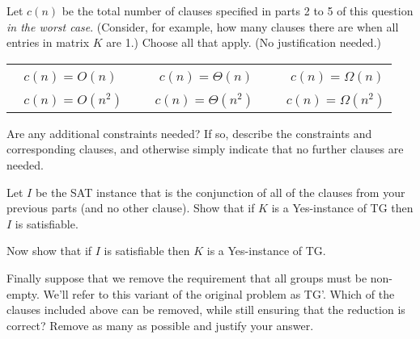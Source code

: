 \documentclass[11pt,fleqn]{exam}
\newcommand{\fillinMCmath}[1]{\begin{tikzpicture}\draw circle [radius=0.5em];\end{tikzpicture}\ #1}
\newif\ifsolutions\solutionsfalse
\begin{document}
\begin{questions}
\question[2]
  Let $c(n)$ be the total number of clauses specified in parts 2 to 5 of this question {\em in the worst case}. (Consider, for example, how many clauses there are when all entries in matrix $K$ are 1.) Choose all that apply. (No justification needed.)

  \vspace{.1in}

    \ifsolutions
    
    \else
      \begin{tabular}{lllll}
        \hspace{.5in} \fillinMCmath{} $c(n) = O(n)$ & \hspace{.5in} & \fillinMCmath{} $c(n) = \Theta(n)$ & \hspace{.5in} & \fillinMCmath{} $c(n) = \Omega(n)$ \\

      \hspace{.5in} \fillinMCmath{} $c(n) = O(n^2)$ & \hspace{.5in} & \fillinMCmath{}$c(n) = \Theta(n^2)$ & \hspace{.5in} & \fillinMCmath{}$c(n) = \Omega(n^2)$
      \end{tabular}
\fi
  \vspace{.1in}

\question[2]
Are any additional constraints needed? If so, describe the constraints and corresponding clauses, and otherwise simply indicate that no further clauses are needed.

    \ifsolutions
    
    \fi
\question[3]
Let $I$ be the SAT instance that is the conjunction of all of the clauses from your previous parts (and no other clause). Show that if $K$ is a Yes-instance of TG then $I$ is satisfiable.

    \ifsolutions
    
\fi

\question[3]
Now show that if $I$ is satisfiable then $K$ is a Yes-instance of TG.

    \ifsolutions
    
    \fi
    
\question[4]
  Finally suppose that we remove the requirement that all groups must be non-empty.
We'll refer to this variant of the original problem as TG'.
  Which of the clauses included above can be removed, while still ensuring that the reduction is correct? Remove as many as possible and justify your answer.

  \ifsolutions
    
\fi
\end{questions}
\end{document}
